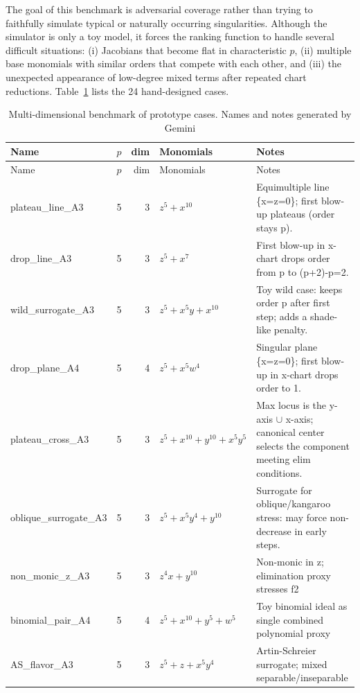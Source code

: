 \documentclass[11pt]{amsart}
\begin{document}
The goal of this benchmark is adversarial coverage rather than trying to faithfully simulate typical or naturally occurring singularities. Although the simulator is only a toy model, it forces the ranking function to handle several difficult situations: (i) Jacobians that become flat in characteristic $p$,
(ii) multiple base monomials with similar orders that compete with each other, and
(iii) the unexpected appearance of low-degree mixed terms after repeated chart reductions.
Table~\ref{tab:legacy-structured} lists the 24 hand-designed cases.

\newpage

\begin{longtable}{@{}p{} r r p{} p{}@{}}
\caption{Multi-dimensional benchmark of prototype cases. Names and notes generated by Gemini}\label{tab:legacy-structured}\\
\toprule
Name & $p$ & dim & Monomials & Notes \\
\midrule
\endfirsthead
\toprule
Name & $p$ & dim & Monomials  & Notes \\
\midrule
\endhead
plateau\_line\_A3 & 5 & 3 & $z^{5} + x^{10}$ & Equimultiple line \{x=z=0\}; first blow-up plateaus (order stays p). \\
drop\_line\_A3 & 5 & 3 & $z^{5} + x^{7}$ & First blow-up in x-chart drops order from p to (p+2)-p=2. \\
wild\_surrogate\_A3 & 5 & 3 & $z^{5} + x^{5}y + x^{10}$ & Toy wild case: keeps order p after first step; adds a shade-like penalty. \\
drop\_plane\_A4 & 5 & 4 & $z^{5} + x^{5}w^{4}$ & Singular plane \{x=z=0\}; first blow-up in x-chart drops order to 1. \\
plateau\_cross\_A3 & 5 & 3 & $z^{5} + x^{10} + y^{10} + x^{5}y^{5}$ & Max locus is the y-axis $\cup$ x-axis; canonical center selects the component meeting elim conditions. \\
oblique\_surrogate\_A3 & 5 & 3 & $z^{5} + x^{5}y^{4} + y^{10}$ & Surrogate for oblique/kangaroo stress: may force non-decrease in early steps. \\
non\_monic\_z\_A3 & 5 & 3 & $z^{4}x + y^{10}$ & Non-monic in z; elimination proxy stresses f2 \\
binomial\_pair\_A4 & 5 & 4 & $z^{5} + x^{10} + y^{5} + w^{5}$ & Toy binomial ideal as single combined polynomial proxy \\
AS\_flavor\_A3 & 5 & 3 & $z^{5} + z + x^{5}y^{4}$ & Artin-Schreier surrogate; mixed separable/inseparable \\

\end{longtable}
\end{document}
